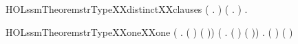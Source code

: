 \begin{SaveVerbatim}{HOLssmTheoremstrTypeXXdistinctXXclauses}
\HOLTokenTurnstile{} (\HOLSymConst{\HOLTokenForall{}} .   \HOLSymConst{\HOLTokenNotEqual{}}  ) \HOLSymConst{\HOLTokenConj{}} (\HOLSymConst{\HOLTokenForall{}} .   \HOLSymConst{\HOLTokenNotEqual{}}  ) \HOLSymConst{\HOLTokenConj{}}
   \HOLSymConst{\HOLTokenForall{}} .   \HOLSymConst{\HOLTokenNotEqual{}}  
\end{SaveVerbatim}
\newcommand{\HOLssmTheoremstrTypeXXdistinctXXclauses}{\UseVerbatim{HOLssmTheoremstrTypeXXdistinctXXclauses}}
\begin{SaveVerbatim}{HOLssmTheoremstrTypeXXoneXXone}
\HOLTokenTurnstile{} (\HOLSymConst{\HOLTokenForall{}} . (  \HOLSymConst{=}  ) \HOLSymConst{\HOLTokenEquiv{}} ( \HOLSymConst{=} )) \HOLSymConst{\HOLTokenConj{}}
   (\HOLSymConst{\HOLTokenForall{}} . (  \HOLSymConst{=}  ) \HOLSymConst{\HOLTokenEquiv{}} ( \HOLSymConst{=} )) \HOLSymConst{\HOLTokenConj{}}
   \HOLSymConst{\HOLTokenForall{}} . (  \HOLSymConst{=}  ) \HOLSymConst{\HOLTokenEquiv{}} ( \HOLSymConst{=} )
\end{SaveVerbatim}
\newcommand{\HOLssmTheoremstrTypeXXoneXXone}{\UseVerbatim{HOLssmTheoremstrTypeXXoneXXone}}

